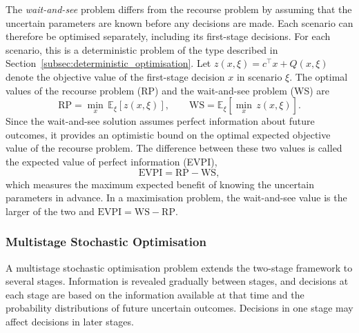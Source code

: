 The \textit{wait-and-see} problem differs from the recourse problem by assuming that the uncertain parameters are known before any decisions are made. Each scenario can therefore be optimised separately, including its first-stage decisions. For each scenario, this is a deterministic problem of the type described in Section~\ref{subsec:deterministic_optimisation}. Let $z(x,\xi)=c^{\top}x+Q(x,\xi)$ denote the objective value of the first-stage decision $x$ in scenario $\xi$. The optimal values of the recourse problem (RP) and the wait-and-see problem (WS) are
\begin{equation}
\mathrm{RP}=\min_{x}\,\mathbb{E}_{\xi}\left[z(x,\xi)\right],
\qquad
\mathrm{WS}=\mathbb{E}_{\xi}\left[\min_{x}\, z(x,\xi)\right].
\label{eq:rp_ws}
\end{equation}
Since the wait-and-see solution assumes perfect information about future outcomes, it provides an optimistic bound on the optimal expected objective value of the recourse problem. The difference between these two values is called the expected value of perfect information (EVPI),
\begin{equation}
\mathrm{EVPI}=\mathrm{RP}-\mathrm{WS},
\label{eq:evpi}
\end{equation}
which measures the maximum expected benefit of knowing the uncertain parameters in advance. %
In a maximisation problem, the wait-and-see value is the larger of the two and $\mathrm{EVPI}=\mathrm{WS}-\mathrm{RP}$.

\subsubsection{Multistage Stochastic Optimisation}
\label{subsec:multistage_stochastic_optimisation}

A multistage stochastic optimisation problem extends the two-stage framework to several stages. Information is revealed gradually between stages, and decisions at each stage are based on the information available at that time and the probability distributions of future uncertain outcomes. %
Decisions in one stage may affect decisions in later stages.

